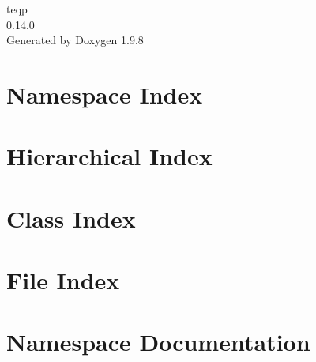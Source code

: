 \documentclass[twoside]{book}
\newcommand{\+}{\discretionary{\mbox{\scriptsize$\hookleftarrow$}}{}{}}
\newcommand{\clearemptydoublepage}{%
    \newpage{\pagestyle{empty}\cleardoublepage}%
  }
\begin{document}
  \raggedbottom
    \hypersetup{pageanchor=false,
                bookmarksnumbered=true,
                pdfencoding=unicode
               }
  \begin{titlepage}
  \vspace*{7cm}
  \begin{center}%
  {\Large teqp}\\
  [1ex]\large 0.\+14.\+0 \\
  \vspace*{1cm}
  {\large Generated by Doxygen 1.9.8}\\
  \end{center}
  \end{titlepage}
  \clearemptydoublepage
  \tableofcontents
  \clearemptydoublepage
  \hypersetup{pageanchor=true}
\chapter{Namespace Index}

\chapter{Hierarchical Index}

\chapter{Class Index}

\chapter{File Index}

\chapter{Namespace Documentation}




















\end{document}
